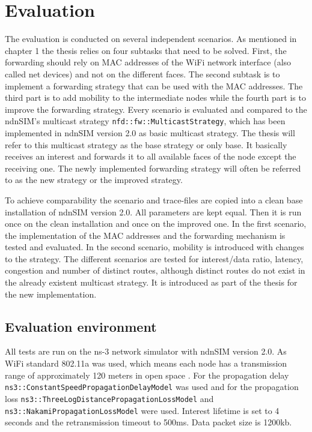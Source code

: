 \chapter{Evaluation}

The evaluation is conducted on several independent scenarios. As mentioned in chapter 1 the thesis relies on four subtasks that need to be solved. First, the forwarding should rely on MAC addresses of the WiFi network interface (also called net devices) and not on the different faces. The second subtask is to implement a forwarding strategy that can be used with the MAC addresses. The third part is to add mobility to the intermediate nodes while the fourth part is to improve the forwarding strategy. Every scenario is evaluated and compared to the ndnSIM's multicast strategy \texttt{nfd::fw::MulticastStrategy}, which has been implemented in ndnSIM version 2.0 as basic multicast strategy. The thesis will refer to this multicast strategy as the base strategy or only base. It basically receives an interest and forwards it to all available faces of the node except the receiving one. The newly implemented forwarding strategy will often be referred to as the new strategy or the improved strategy.

To achieve comparability the scenario and trace-files are copied into a clean base installation of ndnSIM version 2.0. All parameters are kept equal. Then it is run once on the clean installation and once on the improved one. In the first scenario, the implementation of the MAC addresses and the forwarding mechanism is tested and evaluated. In the second scenario, mobility is introduced with changes to the strategy. The different scenarios are tested for interest/data ratio, latency, congestion and number of distinct routes, although distinct routes do not exist in the already existent multicast strategy. It is introduced as part of the thesis for the new implementation.

\section{Evaluation environment}

All tests are run on the ns-3 network simulator with ndnSIM version 2.0.  As WiFi standard 802.11a was used, which means each node has a transmission range of approximately 120 meters in open space \cite{wifi80211a} . For the propagation delay \texttt{ns3::Constant}\texttt{SpeedPropagation}\texttt{DelayModel} was used and for the propagation loss \texttt{ns3::Three}\texttt{LogDistance}\texttt{Propagation}\texttt{LossModel} and \texttt{ns3::}\texttt{Nakami}\texttt{Propagation}\texttt{LossModel} were used. Interest lifetime is set to 4 seconds and the retransmission timeout to 500ms. Data packet size is 1200kb.

